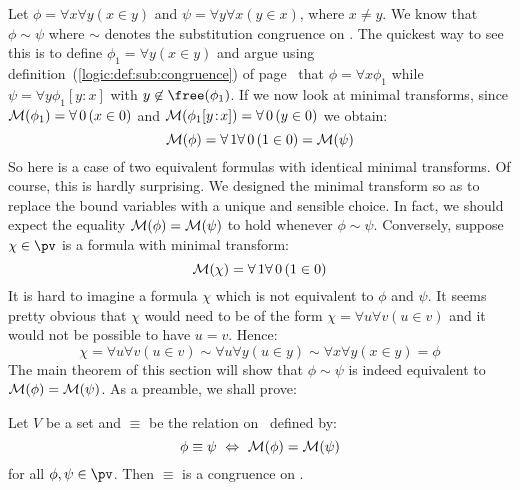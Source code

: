Let $\phi=\forall x\forall y(x\in y)$ and $\psi=\forall y\forall
x(y\in x)$, where $x\neq y$. We know that $\phi\sim\psi$ where
$\sim$ denotes the substitution congruence on \pv. The quickest way
to see this is to define $\phi_{1}=\forall y(x\in y)$ and argue
using definition~(\ref{logic:def:sub:congruence}) of
page~\pageref{logic:def:sub:congruence} that $\phi=\forall
x\phi_{1}$ while $\psi=\forall y\phi_{1}[y\!:\!x]$ with
$y\not\in\free(\phi_{1})$. If we now look at minimal transforms,
since ${\cal M}(\phi_{1})=\forall\,0\,(x\in 0)$ and ${\cal
M}(\phi_{1}[y\!:\!x]) = \forall\,0\,(y\in 0)$ we obtain:
    \[
    {\cal M}(\phi) = \forall\,1\forall\,0\,(1\in 0)={\cal M}(\psi)
    \]
So here is a case of two equivalent formulas with identical minimal
transforms. Of course, this is hardly surprising. We designed the
minimal transform so as to replace the bound variables with a unique
and sensible choice. In fact, we should expect the equality ${\cal
M}(\phi)={\cal M}(\psi)$ to hold whenever $\phi\sim\psi$.
Conversely, suppose $\chi\in\pv$ is a formula with minimal
transform:
    \[
    {\cal M}(\chi)=\forall\,1\forall\,0\,(1\in 0)
    \]
It is hard to imagine a formula $\chi$ which is not equivalent to
$\phi$ and $\psi$. It seems pretty obvious that $\chi$ would need to
be of the form $\chi=\forall u\forall v(u\in v)$ and it would not be
possible to have $u=v$. Hence:
    \[
    \chi=\forall u\forall v(u\in v)\sim\forall u\forall y(u\in
    y)\sim\forall x\forall y(x\in y)=\phi
    \]
The main theorem of this section will show that $\phi\sim\psi$ is
indeed equivalent to ${\cal M}(\phi)={\cal M}(\psi)$. As a preamble,
we shall prove:
\begin{prop}\label{logic:prop:FOPL:mintransfsubcong:congruence}
Let $V$ be a set and $\equiv$ be the relation on \pv\ defined by:
    \[
    \phi\equiv\psi\ \Leftrightarrow\ {\cal M}(\phi)={\cal M}(\psi)
    \]
for all $\phi,\psi\in\pv$. Then $\equiv$ is a congruence on \pv.
\end{prop}
